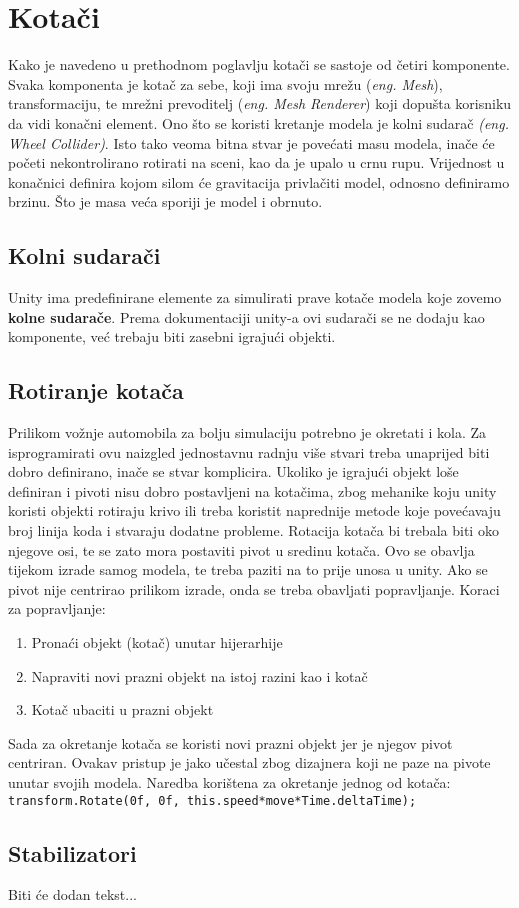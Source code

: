 \section{Kotači}
Kako je navedeno u prethodnom poglavlju kotači se sastoje od četiri komponente. Svaka komponenta je kotač za sebe, koji ima svoju mrežu (\emph{eng. Mesh}), transformaciju, te mrežni prevoditelj (\emph{eng. Mesh Renderer}) koji dopušta korisniku da vidi konačni element. Ono što se koristi kretanje modela je kolni sudarač \emph{(eng. Wheel Collider)}.
\vspace{2mm}
\newline Isto tako veoma bitna stvar je povećati masu modela, inače će početi nekontrolirano rotirati na sceni, kao da je upalo u crnu rupu. Vrijednost u konačnici definira kojom silom će gravitacija privlačiti model, odnosno definiramo brzinu. Što je masa veća sporiji je model i obrnuto.

\subsection{Kolni sudarači}
Unity ima predefinirane elemente za simulirati prave kotače modela koje zovemo \textbf{kolne sudarače}. Prema dokumentaciji unity-a ovi sudarači se ne dodaju kao komponente, već trebaju biti zasebni igrajući objekti. 

\subsection{Rotiranje kotača}
Prilikom vožnje automobila za bolju simulaciju potrebno je okretati i kola. Za isprogramirati ovu naizgled jednostavnu radnju više stvari treba unaprijed biti dobro definirano, inače se stvar komplicira. Ukoliko je igrajući objekt loše definiran i pivoti nisu dobro postavljeni na kotačima, zbog mehanike koju unity koristi objekti rotiraju krivo ili treba koristit naprednije metode koje povećavaju broj linija koda i stvaraju dodatne probleme. Rotacija kotača bi trebala biti oko njegove osi, te se zato mora postaviti pivot u sredinu kotača. Ovo se obavlja tijekom izrade samog modela, te treba paziti na to prije unosa u unity. Ako se pivot nije centrirao prilikom izrade, onda se treba obavljati popravljanje. Koraci za popravljanje:
\begin{enumerate}
	\item Pronaći objekt (kotač) unutar hijerarhije
	\item Napraviti novi prazni objekt na istoj razini kao i kotač
	\item Kotač ubaciti u prazni objekt
\end{enumerate}
Sada za okretanje kotača se koristi novi prazni objekt jer je njegov pivot centriran. Ovakav pristup je jako učestal zbog dizajnera koji ne paze na pivote unutar svojih modela. Naredba korištena za okretanje jednog od kotača:
\vspace{2mm}
\small\texttt{ transform.Rotate(0f, 0f, this.speed*move*Time.deltaTime); }

\subsection{Stabilizatori}
Biti će dodan tekst...
